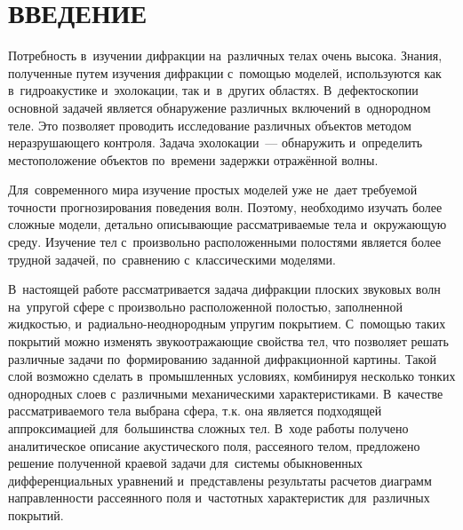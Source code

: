 

\renewcommand{\bibname}{СПИСОК ИСПОЛЬЗОВАННЫХ ИСТОЧНИКОВ}
\renewcommand\refname{СПИСОК ИСПОЛЬЗОВАННЫХ ИСТОЧНИКОВ}

%

\setcounter{page}{2}
\thispagestyle {empty}
\renewcommand{\contentsname}{\centering СОДЕРЖАНИЕ}
\tableofcontents

\newpage
\section*{ВВЕДЕНИЕ}


Потребность в~изучении дифракции на~различных телах очень высока. Знания, полученные путем изучения дифракции с~помощью моделей, используются как в~гидроакустике и~эхолокации, так и~в~других областях. В~дефектоскопии основной задачей является обнаружение различных включений в~однородном теле. Это позволяет проводить исследование различных объектов методом неразрушающего контроля. Задача эхолокации~--- обнаружить и~определить местоположение объектов  по~времени задержки отражённой волны.

Для~современного мира изучение простых моделей уже не~дает требуемой точности прогнозирования поведения волн. Поэтому, необходимо изучать более сложные модели, детально описывающие рассматриваемые тела и~окружающую среду. Изучение тел с~произвольно расположенными полостями является более трудной задачей, по~сравнению с~классическими моделями. 

В~настоящей работе рассматривается задача дифракции плоских звуковых волн на~упругой сфере с произвольно расположенной полостью, заполненной жидкостью, и~радиально-неоднородным упругим покрытием. С~помощью таких покрытий можно изменять звукоотражающие свойства тел, что позволяет решать различные задачи по~формированию заданной дифракционной картины. Такой слой возможно сделать в~промышленных условиях, комбинируя несколько тонких однородных слоев с~различными механическими характеристиками. В~качестве рассматриваемого тела выбрана сфера, т.к. она является подходящей аппроксимацией для~большинства сложных тел. В~ходе работы получено аналитическое описание акустического поля, рассеяного телом, предложено решение полученной краевой задачи для~системы обыкновенных дифференциальных уравнений и~представлены результаты расчетов диаграмм направленности рассеянного поля и~частотных характеристик для~различных покрытий.


\newpage
